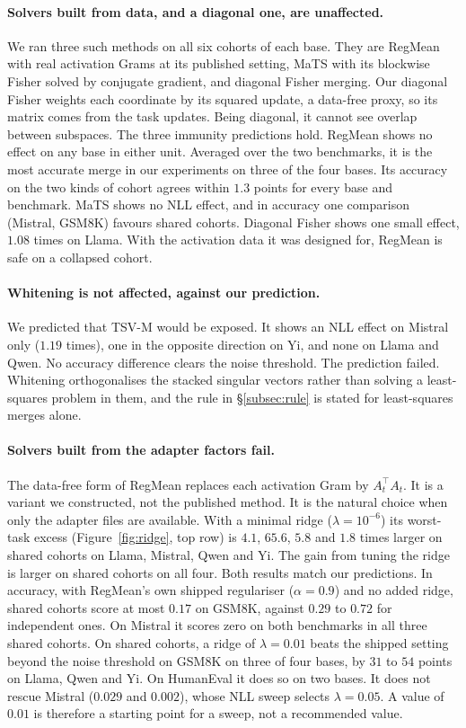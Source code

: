 \paragraph{Solvers built from data, and a diagonal one, are unaffected.} We
ran three such methods on all six cohorts of each base. They are RegMean with
real activation Grams at its published setting, MaTS with its
blockwise Fisher solved by conjugate gradient, and diagonal Fisher merging.
Our diagonal Fisher weights each coordinate by its squared update, a
data-free proxy, so its matrix comes from the task updates. Being diagonal, it
cannot see overlap between subspaces. The three immunity predictions hold.
RegMean shows no effect on any base in either unit. Averaged over the two
benchmarks, it is the most accurate merge in our experiments on three of the
four bases. Its accuracy on the two kinds of cohort agrees within $1.3$
points for every base and benchmark. MaTS shows no NLL effect, and in accuracy one
comparison (Mistral, GSM8K) favours shared cohorts. Diagonal Fisher shows one small
effect, $1.08$ times on Llama. With the activation data it was
designed for, RegMean is safe on a collapsed cohort.

\paragraph{Whitening is not affected, against our prediction.} We predicted
that TSV-M would be exposed. It shows an NLL effect on Mistral only ($1.19$
times), one in the opposite direction on Yi, and none on Llama and Qwen. No
accuracy difference clears the noise threshold. The prediction failed. Whitening
orthogonalises the stacked singular vectors rather than solving a
least-squares problem in them, and the rule in \S\ref{subsec:rule} is stated
for least-squares merges alone.

\paragraph{Solvers built from the adapter factors fail.} The data-free form of
RegMean replaces each activation Gram by $A_t^\top A_t$. It is a variant we
constructed, not the published method. It is the natural choice when only the
adapter files are available. With a minimal ridge ($\lambda = 10^{-6}$) its
worst-task excess (Figure~\ref{fig:ridge}, top row) is $4.1$, $65.6$, $5.8$
and $1.8$ times larger on shared cohorts on Llama, Mistral, Qwen and Yi. The
gain from tuning the ridge is larger on shared cohorts on all four. Both
results match our predictions. In accuracy, with RegMean's own
shipped regulariser ($\alpha = 0.9$) and no added ridge, shared cohorts score
at most $0.17$ on GSM8K, against $0.29$ to $0.72$ for independent ones. On Mistral it scores zero on both
benchmarks in all three shared cohorts. On shared cohorts, a ridge of
$\lambda = 0.01$ beats the shipped setting beyond the noise threshold on
GSM8K on three of four bases, by $31$ to $54$ points on Llama, Qwen and Yi.
On HumanEval it does so on two bases. It does not rescue Mistral ($0.029$ and $0.002$),
whose NLL sweep selects $\lambda = 0.05$. A value of $0.01$ is therefore a
starting point for a sweep, not a recommended value.

